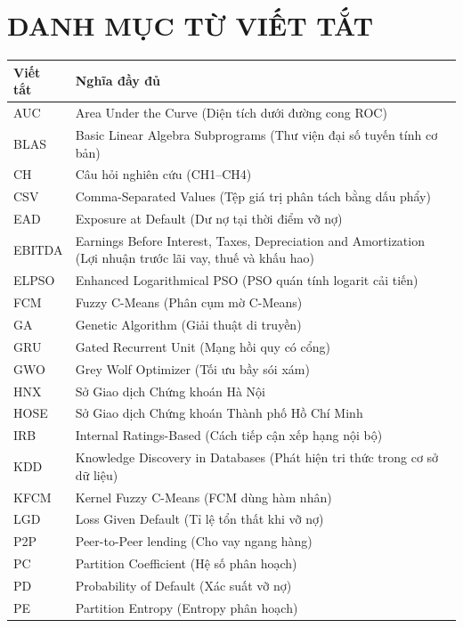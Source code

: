 \documentclass[a4paper,12pt,oneside]{report}
\begin{document}
\chapter*{DANH MỤC TỪ VIẾT TẮT}

{\small{}
\begin{longtable}{@{}lp{11.5cm}@{}}
\toprule
\textbf{Viết tắt} & \textbf{Nghĩa đầy đủ} \\
\midrule
AUC     & Area Under the Curve (Diện tích dưới đường cong ROC) \\
BLAS    & Basic Linear Algebra Subprograms (Thư viện đại số tuyến tính cơ bản) \\
CH      & Câu hỏi nghiên cứu (CH1--CH4) \\
CSV     & Comma-Separated Values (Tệp giá trị phân tách bằng dấu phẩy) \\
EAD     & Exposure at Default (Dư nợ tại thời điểm vỡ nợ) \\
EBITDA  & Earnings Before Interest, Taxes, Depreciation and Amortization (Lợi nhuận trước lãi vay, thuế và khấu hao) \\
ELPSO   & Enhanced Logarithmical PSO (PSO quán tính logarit cải tiến) \\
FCM     & Fuzzy C-Means (Phân cụm mờ C-Means) \\
GA      & Genetic Algorithm (Giải thuật di truyền) \\
GRU     & Gated Recurrent Unit (Mạng hồi quy có cổng) \\
GWO     & Grey Wolf Optimizer (Tối ưu bầy sói xám) \\
HNX     & Sở Giao dịch Chứng khoán Hà Nội \\
HOSE    & Sở Giao dịch Chứng khoán Thành phố Hồ Chí Minh \\
IRB     & Internal Ratings-Based (Cách tiếp cận xếp hạng nội bộ) \\
KDD     & Knowledge Discovery in Databases (Phát hiện tri thức trong cơ sở dữ liệu) \\
KFCM    & Kernel Fuzzy C-Means (FCM dùng hàm nhân) \\
LGD     & Loss Given Default (Tỉ lệ tổn thất khi vỡ nợ) \\
P2P     & Peer-to-Peer lending (Cho vay ngang hàng) \\
PC      & Partition Coefficient (Hệ số phân hoạch) \\
PD      & Probability of Default (Xác suất vỡ nợ) \\
PE      & Partition Entropy (Entropy phân hoạch) \\

\end{longtable}}
\end{document}
